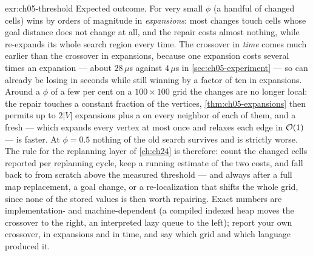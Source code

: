 \begin{solution}{exr:ch05-threshold}
Expected outcome. For very small $\phi$ (a handful of changed cells) \dstarlite wins by
orders of magnitude in \emph{expansions}: most changes touch cells whose goal distance
does not change at all, and the repair costs almost nothing, while \astar re-expands its
whole search region every time. The crossover in \emph{time} comes much earlier than the
crossover in expansions, because one \dstarlite expansion costs several times an \astar
expansion --- about $28\,\mu$s against $4\,\mu$s in \cref{sec:ch05-experiment} ---
so \dstarlite can already be losing in seconds while still winning by a factor of ten in
expansions. Around a $\phi$ of a few per cent on a $100\times 100$ grid the changes are
no longer local: the repair touches a constant fraction of the vertices,
\cref{thm:ch05-expansions} then permits up to $2|V|$ expansions plus a
\DslUpdateVertex on every neighbor of each of them, and a fresh \astar --- which
expands every vertex at most once and relaxes each edge in $\mathcal{O}\!\left(1\right)$ --- is faster. At
$\phi=0.5$ nothing of the old search survives and \dstarlite is strictly worse.
The rule for the replanning layer of \cref{ch:ch24} is therefore: count the changed
cells reported per replanning cycle, keep a running estimate of the two costs, and fall
back to \astar from scratch above the measured threshold --- and always after a full map
replacement, a goal change, or a re-localization that shifts the whole grid, since none
of the stored values is then worth repairing. Exact numbers are implementation- and
machine-dependent (a compiled indexed heap moves the crossover to the right, an
interpreted lazy queue to the left); report your own crossover, in expansions and in
time, and say which grid and which language produced it.
\end{solution}

